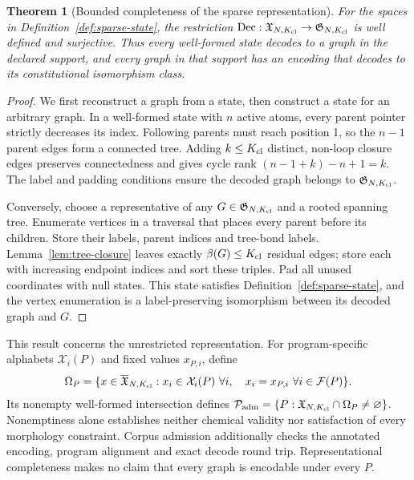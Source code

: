 \documentclass{article}
\newtheorem{theorem}{Theorem}[section]
\theoremstyle{definition}
\begin{document}
\begin{theorem}[Bounded completeness of the sparse representation]
\label{thm:bounded-representation}
For the spaces in Definition~\ref{def:sparse-state}, the restriction
$\operatorname{Dec}:\mathfrak X_{N,K_{\rm cl}}\to\mathfrak G_{N,K_{\rm cl}}$ is well defined
and surjective. Thus every well-formed state decodes to a graph in the declared support, and every
graph in that support has an encoding that decodes to its constitutional isomorphism class.
\end{theorem}
\begin{proof}
We first reconstruct a graph from a state, then construct a state for an arbitrary graph.
In a well-formed state with $n$ active atoms, every parent pointer strictly decreases its index.
Following parents must reach position 1, so the $n-1$ parent edges form a connected tree.
Adding $k\leq K_{\rm cl}$ distinct, non-loop closure edges preserves connectedness and gives cycle
rank $(n-1+k)-n+1=k$. The label and padding conditions ensure the decoded graph belongs to
$\mathfrak G_{N,K_{\rm cl}}$.

Conversely, choose a representative of any $G\in\mathfrak G_{N,K_{\rm cl}}$ and a rooted spanning
tree. Enumerate vertices in a traversal that places every parent before its children. Store their
labels, parent indices and tree-bond labels. Lemma~\ref{lem:tree-closure} leaves exactly
$\beta(G)\leq K_{\rm cl}$ residual edges; store each with increasing endpoint indices and sort
these triples. Pad all unused coordinates with null states. This state satisfies
Definition~\ref{def:sparse-state}, and the vertex enumeration is a label-preserving isomorphism
between its decoded graph and $G$.
\end{proof}

This result concerns the unrestricted representation. For program-specific alphabets
$\mathcal X_i(P)$ and fixed values $x_{P,i}$, define
\begin{equation}
 \Omega_P=\{x\in\overline{\mathfrak X}_{N,K_{\rm cl}}:
 x_i\in\mathcal X_i(P)\ \forall i,\quad x_i=x_{P,i}\ \forall i\in\mathcal F(P)\}.
 \label{eq:program-state-set}
\end{equation}
Its nonempty well-formed intersection defines
$\mathcal P_{\rm adm}=\{P:\mathfrak X_{N,K_{\rm cl}}\cap\Omega_P\neq\varnothing\}$.
Nonemptiness alone establishes neither chemical validity nor satisfaction of every morphology
constraint. Corpus admission additionally checks the annotated encoding, program alignment and
exact decode round trip. Representational completeness makes no claim that every graph is
encodable under every $P$.
\end{document}
